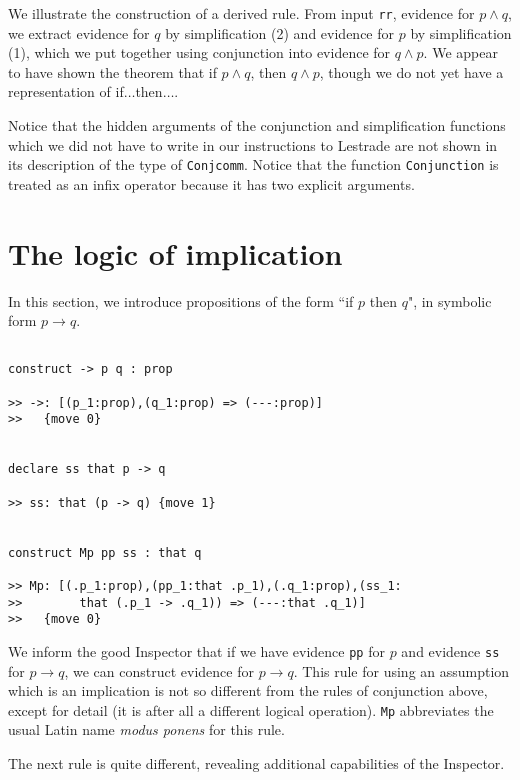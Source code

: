 \documentclass[12pt]{article}
\begin{document}
We illustrate the construction of a derived rule.  From input {\tt rr}, evidence for $p \wedge q$, we extract evidence for $q$ by simplification (2)
and evidence for $p$ by simplification (1), which we put together using conjunction into evidence for $q \wedge p$.  We appear to have shown the theorem that if $p \wedge q$, then $q \wedge p$, though we do not yet have a representation of if$\ldots$then$\ldots$.

Notice that the hidden arguments of the conjunction and simplification functions which we did not have to write in our instructions to Lestrade are not shown in its description of the type of
{\tt Conjcomm}.  Notice that the function {\tt Conjunction} is treated as an infix operator because it has two explicit arguments.

\section{The logic of implication}

In this section, we introduce propositions of the form ``if $p$ then $q$", in symbolic form $p \rightarrow q$.

\begin{verbatim}

construct -> p q : prop

>> ->: [(p_1:prop),(q_1:prop) => (---:prop)]
>>   {move 0}


declare ss that p -> q

>> ss: that (p -> q) {move 1}


construct Mp pp ss : that q

>> Mp: [(.p_1:prop),(pp_1:that .p_1),(.q_1:prop),(ss_1:
>>        that (.p_1 -> .q_1)) => (---:that .q_1)]
>>   {move 0}

\end{verbatim}

We inform the good Inspector that if we have evidence {\tt pp} for $p$ and evidence {\tt ss} for $p \rightarrow q$, we can construct evidence
for $p \rightarrow q$.  This rule for using an assumption which is an implication is not so different from the rules of conjunction above, except for detail (it is after all a different logical operation).  {\tt Mp} abbreviates the usual Latin name {\em modus ponens\/} for this rule.

The next rule is quite different, revealing additional capabilities of the Inspector.
\end{document}
